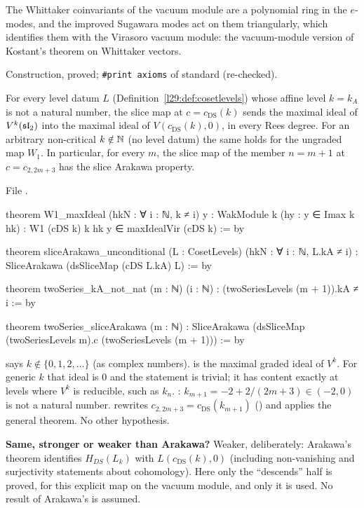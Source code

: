 \begin{physics}
The Whittaker coinvariants of the vacuum module are a polynomial ring in the $e$-modes, and the improved Sugawara
modes act on them triangularly, which identifies them with the Virasoro vacuum module: the vacuum-module version of
Kostant's theorem on Whittaker vectors.
\end{physics}

\begin{status}
Construction, proved; \texttt{\#print axioms} of  standard (re-checked).
\end{status}

\begin{theorem}\label{l29:thm:slicearakawa}
For every level datum $L$ (Definition~\ref{l29:def:cosetlevels}) whose affine level $k=k_A$ is not a natural number, the slice map
at $c=c_{\mathrm{DS}}(k)$ sends the maximal ideal of $V^k(\mathfrak{sl}_2)$ into the maximal ideal of $V(c_{\mathrm{DS}}(k),0)$, in every
Rees degree. For an arbitrary non-critical $k\notin{\mathbb{N}}$ (no level datum) the same holds for the ungraded map $W_1$. In particular, for every $m$, the slice map of
the member $n=m+1$ at $c=c_{2,2m+3}$ has the slice Arakawa property.
\end{theorem}

\noindent File .
\begin{leancode}
theorem W1_maxIdeal (hkN : ∀ i : ℕ, k ≠ i) {y : WakModule k} (hy : y ∈ Imax k hk) :
    W1 (cDS k) k hk y ∈ maxIdealVir (cDS k) := by

theorem sliceArakawa_unconditional (L : CosetLevels) (hkN : ∀ i : ℕ, L.kA ≠ i) :
    SliceArakawa (dsSliceMap (cDS L.kA) L) := by

theorem twoSeries_kA_not_nat (m : ℕ) (i : ℕ) : (twoSeriesLevels (m + 1)).kA ≠ i := by

theorem twoSeries_sliceArakawa (m : ℕ) :
    SliceArakawa (dsSliceMap (twoSeriesLevels m).c (twoSeriesLevels (m + 1))) := by
\end{leancode}

\begin{dictionary}
 says $k\notin\{0,1,2,\dots\}$ (as complex numbers).  is the maximal graded
ideal of $V^k$. For generic $k$ that ideal is $0$ and the statement is trivial; it has content exactly at levels where
$V^k$ is reducible, such as $k_n$. : $k_{m+1}=-2+2/(2m+3)\in(-2,0)$ is not a natural number.
 rewrites $c_{2,2m+3}=c_{\mathrm{DS}}(k_{m+1})$ () and applies the
general theorem. No other hypothesis.

\textbf{Same, stronger or weaker than Arakawa?} Weaker, deliberately: Arakawa's theorem identifies $H_{DS}(L_k)$ with
$L(c_{\mathrm{DS}}(k),0)$ (including non-vanishing and surjectivity statements about cohomology). Here only the
``descends'' half is proved, for this explicit map on the vacuum module, and only it is used. No result of Arakawa's is
assumed.
\end{dictionary}

